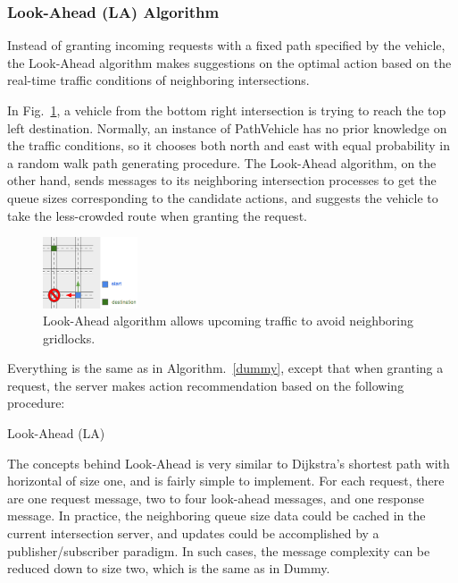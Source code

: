 \documentclass[conference]{IEEEtran}
\begin{document}
\subsubsection{ Look-Ahead (LA) Algorithm}

Instead of granting incoming requests with a fixed path specified by the vehicle, the Look-Ahead algorithm makes suggestions on the optimal action based on the real-time traffic conditions of neighboring intersections. 

In Fig.~\ref{la_example}, a vehicle from the bottom right intersection is trying to reach the top left destination. Normally, an instance of PathVehicle has no prior knowledge on the traffic conditions, so it chooses both north and east with equal probability in a random walk path generating procedure. The Look-Ahead algorithm, on the other hand, sends messages to its neighboring intersection processes to get the queue sizes corresponding to the candidate actions, and suggests the vehicle to take the less-crowded route when granting the request.



\begin{figure}[h]
    \center    
    \includegraphics[width=0.25\textwidth]{images/la_example.png}
	\caption{Look-Ahead algorithm allows upcoming traffic to avoid neighboring gridlocks.}
	\label{la_example}
\end{figure}

\begin{algorithm}
  Everything is the same as in Algorithm.~\ref{dummy}, except that when granting a request, the server makes action recommendation based on the following procedure:
  
  \caption{Look-Ahead (LA) \label{look_ahead}}
\end{algorithm}

The concepts behind Look-Ahead is very similar to Dijkstra's shortest path \cite{dijkstra} with horizontal of size one, and is fairly simple to implement. For each request, there are one request message, two to four look-ahead messages, and one response message. In practice, the neighboring queue size data could be cached in the current intersection server, and updates could be accomplished by a publisher/subscriber paradigm. In such cases, the message complexity can be reduced down to size two, which is the same as in Dummy.
\end{document}

